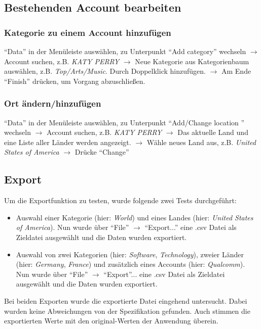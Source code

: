 \subsection{Bestehenden Account bearbeiten}

\subsubsection{Kategorie zu einem Account hinzufügen}
"`Data"' in der Menüleiste auswählen, zu Unterpunkt "`Add category"' wechseln $\to$ Account suchen,  z.B. \textit{KATY PERRY} $\to$ Neue Kategorie aus Kategorienbaum auswählen, z.B. \textit{Top/Arts/Music}. Durch Doppelklick hinzufügen. $\to$ Am Ende "`Finish"' drücken, um Vorgang abzuschließen.

\subsubsection{Ort ändern/hinzufügen}
"`Data"' in der Menüleiste auswählen, zu Unterpunkt "`Add/Change location "' wechseln $\to$ Account suchen,  z.B. \textit{KATY PERRY} $\to$ Das aktuelle Land und eine Liste aller Länder werden angezeigt. $\to$ Wähle neues Land aus, z.B. \textit{United States of America} $\to$ Drücke "`Change"'

\subsection{Export}
Um die Exportfunktion zu testen, wurde folgende zwei Tests durchgeführt:
\begin{itemize}
\item Auswahl einer Kategorie (hier: \textit{World}) und eines Landes (hier: \textit{United States of America}). Nun wurde über "`File"' $\to$ "`Export..."' eine .csv Datei als Zieldatei ausgewählt und die Daten wurden exportiert.
\item Auswahl von zwei Kategorien (hier: \textit{Software}, \textit{Technology}), zweier Länder (hier: \textit{Germany}, \textit{France}) und zusätzlich eines Accounts (hier: \textit{Qualcomm}). Nun wurde über "`File"' $\to$ "`Export"'... eine .csv Datei als Zieldatei ausgewählt und die Daten wurden exportiert.
\end{itemize}
Bei beiden Exporten wurde die exportierte Datei eingehend untersucht. Dabei wurden keine Abweichungen von der Spezifikation gefunden. Auch stimmen die exportierten Werte mit den original-Werten der Anwendung überein.
